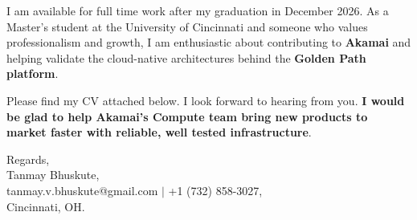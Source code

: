 \documentclass[11pt]{letter}
\begin{document}
\begin{letter}{}
I am available for full time work after my graduation in December 2026. As a Master's student at the University of Cincinnati and someone who values professionalism and growth, I am enthusiastic about contributing to \textbf{Akamai} and helping validate the cloud-native architectures behind the \textbf{Golden Path platform}.

Please find my CV attached below. I look forward to hearing from you. \textbf{I would be glad to help Akamai's Compute team bring new products to market faster with reliable, well tested infrastructure}.

{\setlength{\parskip}{0pt}
Regards,\\
Tanmay Bhuskute,\\
tanmay.v.bhuskute@gmail.com $\mid$ +1 (732) 858-3027,\\
Cincinnati, OH.
}

\end{letter}
\end{document}

